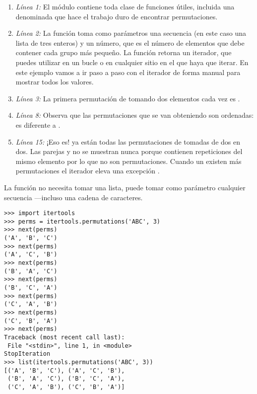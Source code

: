 \begin{enumerate}

\item \emph{Línea 1:} El módulo  contiene toda clase de funciones útiles, incluida una denominada  que hace el trabajo duro de encontrar permutaciones.

\item \emph{Línea 2:} La función  toma como parámetros una secuencia (en este caso una lista de tres enteros) y un número, que es el número de elementos que debe contener cada grupo más pequeño. La función retorna un iterador, que puedes utilizar en un bucle  o en cualquier sitio en el que haya que iterar. En este ejemplo vamos a ir paso a paso con el iterador de forma manual para mostrar todos los valores.

\item \emph{Línea 3:} La primera permutación de \codigo{[1, 2, 3]} tomando dos elementos cada vez es .

\item \emph{Línea 8:} Observa que las permutaciones que se van obteniendo son ordenadas:  es diferente a .

\item \emph{Línea 15:} ¡Eso es! ya están todas las permutaciones de \codigo{[1, 2, 3]} tomadas de dos en dos. Las parejas  y  no se muestran nunca porque contienen repeticiones del mismo elemento por lo que no son permutaciones. Cuando un existen más permutaciones el iterador eleva una excepción .

\end{enumerate}

La función  no necesita tomar una lista, puede tomar como parámetro cualquier secuencia ---incluso una cadena de caracteres.

\noindent\begin{minipage}{\textwidth}
\begin{lstlisting}[mathescape=True]
>>> import itertools 
>>> perms = itertools.permutations('ABC', 3)
>>> next(perms) 
('A', 'B', 'C')
>>> next(perms) 
('A', 'C', 'B') 
>>> next(perms) 
('B', 'A', 'C') 
>>> next(perms) 
('B', 'C', 'A') 
>>> next(perms) 
('C', 'A', 'B') 
>>> next(perms) 
('C', 'B', 'A') 
>>> next(perms) 
Traceback (most recent call last):
 File "<stdin>", line 1, in <module> 
StopIteration 
>>> list(itertools.permutations('ABC', 3))
[('A', 'B', 'C'), ('A', 'C', 'B'),
 ('B', 'A', 'C'), ('B', 'C', 'A'),
 ('C', 'A', 'B'), ('C', 'B', 'A')]
\end{lstlisting}
\end{minipage}

